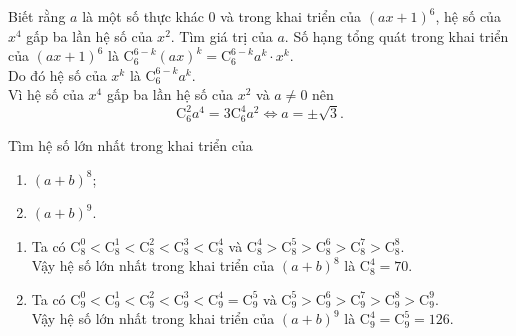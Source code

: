 \begin{bt}%
%
Biết rằng $a$ là một số thực khác $0$ và trong khai triển của $(ax+1)^6$, hệ số của $x^4$ gấp ba lần hệ số của $x^2$. Tìm giá trị của $a$.
\loigiai
{
Số hạng tổng quát trong khai triển của $(ax+1)^6$ là $\mathrm{C}_6^{6-k}(ax)^k=\mathrm{C}_6^{6-k}a^k\cdot x^k$.\\
Do đó hệ số của $x^k$ là $\mathrm{C}_6^{6-k}a^k$.\\
Vì hệ số của $x^4$ gấp ba lần hệ số của $x^2$ và $a\neq 0$ nên
$$\mathrm{C}_6^2a^4=3\mathrm{C}_6^4a^2\Leftrightarrow a=\pm \sqrt{3}.$$
}
\end{bt}

\begin{bt}%
%
Tìm hệ số lớn nhất trong khai triển của
\begin{enumerate}
\item $(a+b)^8$;
\item $(a+b)^9$.
\end{enumerate}
\loigiai
{
\begin{enumerate}
\item Ta có $\mathrm{C}_8^0<\mathrm{C}_8^1<\mathrm{C}_8^2<\mathrm{C}_8^3<\mathrm{C}_8^4$ và $\mathrm{C}_8^4>\mathrm{C}_8^5>\mathrm{C}_8^6>\mathrm{C}_8^7>\mathrm{C}_8^8$.\\
Vậy hệ số lớn nhất trong khai triển của $(a+b)^8$ là $\mathrm{C}_8^4=70$.
\item Ta có $\mathrm{C}_9^0<\mathrm{C}_9^1<\mathrm{C}_9^2<\mathrm{C}_9^3<\mathrm{C}_9^4=\mathrm{C}_9^5$ và $\mathrm{C}_9^5>\mathrm{C}_9^6>\mathrm{C}_9^7>\mathrm{C}_9^8>\mathrm{C}_9^9$.\\
Vậy hệ số lớn nhất trong khai triển của $(a+b)^9$ là $\mathrm{C}_9^4=\mathrm{C}_9^5=126$.
\end{enumerate}
}
\end{bt}


